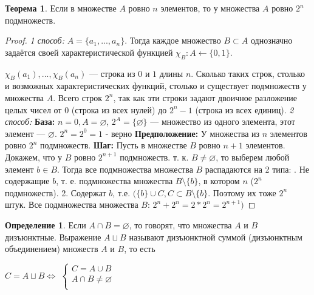\documentclass[12pt,oneside]{article}
\theoremstyle{definition}
\newtheorem{definition}{Определение}
\newtheorem{theorem}{Теорема}[section]
\begin{document}
\begin{theorem}\label{teorem_2A}
Если в множестве $A$ ровно $n$ элементов, то у множества $A$ ровно $2^n$ подмножеств.
 
\begin{proof}{}
{\it 1 способ: } 
$A = \{a_{1}, ..., a_{n}\}$. Тогда каждое множество $B\subset A$ однозначно задаётся своей характеристической функцией
$\chi_{B}: A \leftarrow \{0, 1\}$.

$\chi_{B}(a_{1}), ..., \chi_{B}(a_{n})$ --- строка из $0$ и $1$ длины $n$. Сколько таких строк, столько и возможных характеристических функций, столько и существует подмножеств у множества $A$. Всего строк $2^n$, так как эти строки задают двоичное разложение целых чисел от 0 (строка из всех нулей) до $2^n-1$ (строка из всех единиц).
\newline
{\it 2 способ: }
\newline
\textbf{База: } $n=0, A=\varnothing$, $2^A=\{\varnothing\}$ --- множество из одного элемента, этот элемент --- $\varnothing$.
\newline
$2^n = 2^0 = 1$ - верно
\newline
\textbf{Предположение: } У множества из $n$ элементов ровно $2^n$ подмножеств.
\newline
\textbf{Шаг: } Пусть в множестве $B$ ровно $n+1$ элементов. Докажем, что у $B$ ровно  $2^{n+1}$ подмножеств.
\newline
т. к. $B\neq \varnothing$, то выберем любой элемент $b\in B$. Тогда все подмножества множества $B$ распадаются на 2 типа:
. Не содержащие $b$, т. е. подмножества множества
$B\setminus\{b\}$, в котором $n$ ($2^n$ подмножеств).
2. Содержат $b$, т.е. $(\{b\}\cup C, C\subset B\setminus\{b\}$. Поэтому их тоже $2^n$ штук.
\newline
Все подмножества множества $B$: 
\newline
$2^n + 2^n = 2*2^n = 2^{n+1})$
\end{proof}
\end{theorem} 

\begin{definition}Если $A\cap B=\varnothing$, то говорят, что множества $A$ и $B$ дизъюнктные. Выражение $A\sqcup B$ называют дизъюнктной суммой (дизъюнктным объединением) множеств $A$  и $B$, то есть


$C = A\sqcup B \Longleftrightarrow $
$\begin{cases} 
        C = A\cup B\\
        A\cap B \neq \varnothing\\
\end{cases}$
\end{definition}
\end{document}
